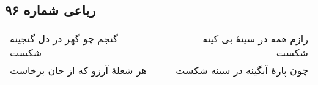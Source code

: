 \begin{center}
\section*{رباعی شماره ۹۶}
\label{sec:sh096}
\begin{longtable}{l p{0.5cm} r}
گنجم چو گهر در دل گنجینه شکست
&&
رازم همه در سینهٔ بی کینه شکست
\\
هر شعلهٔ آرزو که از جان برخاست
&&
چون پارهٔ آبگینه در سینه شکست
\\
\end{longtable}
\end{center}
